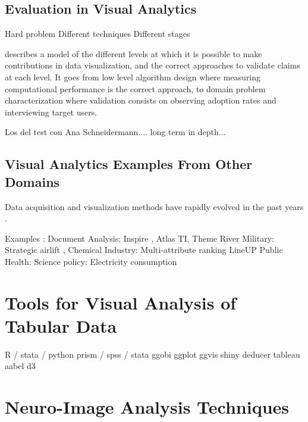 \subsection{Evaluation in Visual Analytics}

Hard problem
Different techniques
Different stages

\autocite{munzner_nested_2009} describes a model of the different levels at which it is possible to make contributions in data visualization, and the correct approaches to validate claims at each level. It goes from low level algorithm design where measuring computational performance is the correct approach, to domain problem characterization where validation consists on observing adoption rates and interviewing target users.

Los del test con Ana
Schneidermann.... long term in depth...

\subsection{Visual Analytics Examples From Other Domains}

Data acquisition and visualization methods have rapidly evolved in the past years \autocite{botha_individual_2012}.

Examples : 
Document Analysis: Inspire \autocite{hetzler_analysis_2004}, Atlas TI, Theme River \autocite{themerivertm:_2002}
Military: Strategic airlift \autocite{soban_visual_2011},
Chemical Industry: \autocite{stahl_overview_2013}
Multi-attribute ranking LineUP \autocite{gratzl_lineup:_2013}
Public Health: \autocite{sedig_challenge_2014}
Science policy: \autocite{mcinerny_information_2014}
Electricity consumption \autocite{janetzko_anomaly_2014}

\section{Tools for Visual Analysis of Tabular Data}

R  / stata  / python
prism / spss / stata
ggobi
ggplot \autocite{wickham_practical_2008}
ggvis
shiny
deducer
tableau
aabel
d3

\begin{table}
	\centering
		\begin{tabular}
			
		\end{tabular}
	\label{tab_related_tabular_applications}
\end{table}

\section{Neuro-Image Analysis Techniques}

